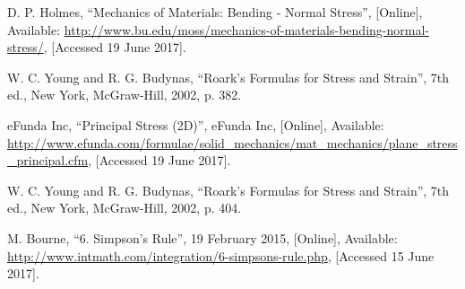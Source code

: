 \documentclass[11pt]{meetingmins}
\begin{document}
\begin{thebibliography}{99}
	D. P. Holmes, “Mechanics of Materials: Bending - Normal Stress”, [Online], Available: \url{http://www.bu.edu/moss/mechanics-of-materials-bending-normal-stress/}, [Accessed 19 June 2017].

	W. C. Young and R. G. Budynas, “Roark's Formulas for Stress and Strain”, 7th ed., New York, McGraw-Hill, 2002, p. 382.

	eFunda Inc, “Principal Stress (2D)”, eFunda Inc, [Online], Available: \url{http://www.efunda.com/formulae/solid_mechanics/mat_mechanics/plane_stress_principal.cfm}, [Accessed 19 June 2017].

	W. C. Young and R. G. Budynas, “Roark's Formulas for Stress and Strain”, 7th ed., New York, McGraw-Hill, 2002, p. 404.

	M. Bourne, “6. Simpson's Rule”, 19 February 2015, [Online], Available: \url{http://www.intmath.com/integration/6-simpsons-rule.php}, [Accessed 15 June 2017].

\end{thebibliography}
\end{document}
